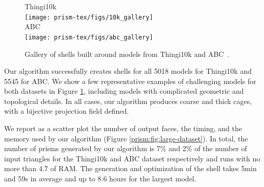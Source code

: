 
\begin{figure}
    \centering
    Thingi10k\\
    \texttt{[image: prism-tex/figs/10k\_gallery]}\\%
    ABC\\
    \texttt{[image: prism-tex/figs/abc\_gallery]}
    \caption{Gallery of shells built around models from Thingi10k \protect\cite{zhou2016thingi10k} and ABC~\protect\cite{Koch_2019_CVPR}.}
    \label{prism:fig:gallery}
    
\end{figure}


Our algorithm successfully creates shells for all 5018 models for Thingi10k and 5545 for ABC. 
We show a few representative examples of challenging models for both datasets in Figure \ref{prism:fig:gallery}, including models with complicated geometric and topological details. In all cases, our algorithm produces coarse and thick cages, with a bijective projection field defined.

We report as a scatter plot the number of output faces, the timing, and the memory used by our algorithm (Figure \ref{prism:fig:large-dataset}).
In total, the number of prisms generated by our algorithm is 7\% and 2\% of the number of input triangles for the Thingi10k and ABC dataset respectively 
and runs with no more than 4.7  of RAM. 
The generation and optimization of the shell takes 5min and 59s in average and up to 8.6 hours for the largest model. 

